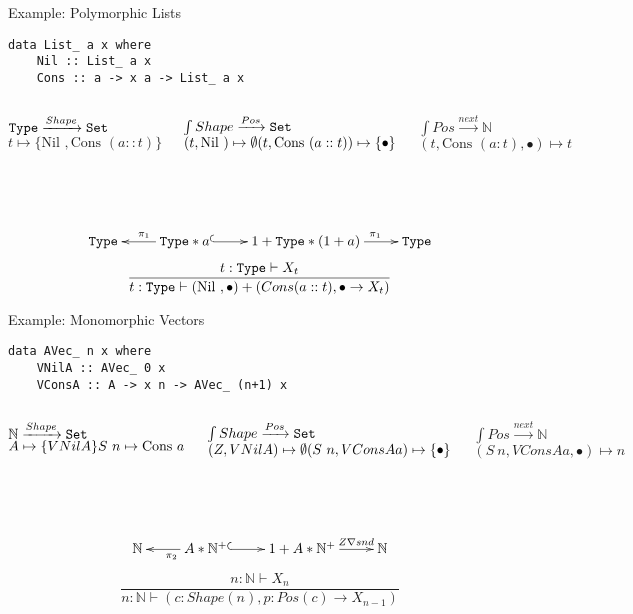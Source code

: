 \documentclass{beamer}
\newcommand{\NN}{\mathbb{N}}
\newcommand{\Set}{{\tt Set }}
\newcommand{\Type}{{\tt Type }}
\newcommand{\Nil}{\mbox{Nil }}
\newcommand{\Cons}{\mbox{Cons }}
\begin{document}
\begin{frame}[fragile]{Example: Polymorphic Lists}
\begin{lstlisting}
data List_ a x where
    Nil :: List_ a x
    Cons :: a -> x a -> List_ a x
\end{lstlisting}
\pause
\begin{columns}
\begin{block}{$\Type \xrightarrow{Shape} \Set$}
$t \mapsto \{\Nil,\Cons (a :: t)\}$
\end{block}

\begin{block}{$\int Shape \xrightarrow{Pos} \Set$}
$(t, \Nil) \mapsto \emptyset\\
(t,\Cons (a :: t)) \mapsto \{\bullet\}$
\end{block}

\begin{block}{$\int Pos \xrightarrow{next} \NN$}
$(t,\Cons (a : t),\bullet) \mapsto t$
\end{block}
\end{columns}
\\~\\
\pause
 \[\xymatrix{
 \Type & \Type * a \ar[l]_{\pi_1} \ar@{^{(}->}[r] & 1 + \Type * (1 + a) \ar[r]^{\quad\quad\pi_1} & \Type}\]
 \pause
 \[
\frac{t : \Type \vdash X_t}{ t : \Type \vdash (\Nil, \bullet) + (Cons (a :: t), \bullet \to X_t) }
\]
\end{frame}



\begin{frame}[fragile]{Example: Monomorphic Vectors}
\begin{lstlisting}
data AVec_ n x where
    VNilA :: AVec_ 0 x
    VConsA :: A -> x n -> AVec_ (n+1) x
\end{lstlisting}
\pause
\begin{columns}
\begin{block}{$\NN \xrightarrow{Shape} \Set$}
$A \mapsto \{VNilA\}\\
S~n \mapsto \Cons a$
\end{block}

\begin{block}{$\int Shape \xrightarrow{Pos} \Set$}
$(Z, VNilA) \mapsto \emptyset\\
(S~n,VConsA a) \mapsto \{\bullet\}$
\end{block}

\begin{block}{$\int Pos \xrightarrow{next} \NN$}
$(S~n,VConsA a,\bullet) \mapsto n$
\end{block}
\end{columns}
\\~\\
\pause
 \[\xymatrix{
 \NN & A*\NN^+ \ar[l]^{\pi_2} \ar@{^{(}->}[r] & 1 + A*\NN^+ \ar[r]^{\quad\quad Z \nabla snd} & \NN}\]
 \pause
 \[
\frac{n : \NN \vdash X_n}{ n : \NN \vdash (c : Shape(n), p : Pos(c) \to X_{n-1})}
\]
\end{frame}
\end{document}
